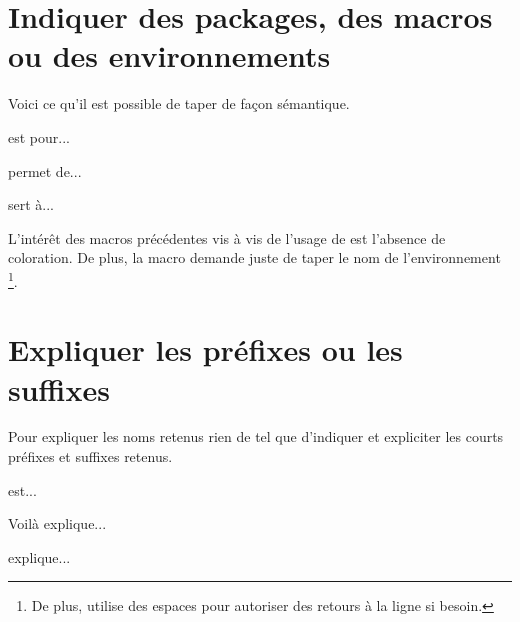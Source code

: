 

\usepackage[lang = FR]{../main/main}
\usepackage{../listing/listing}
\usepackage{../rem-exa/rem-exa}


\usepackage{macroenv}




\section{Indiquer des packages, des macros ou des environnements}

Voici ce qu'il est possible de taper de façon sémantique.

\begin{bdoclatex}
 est pour...

 permet de...

 sert à...
\end{bdoclatex}


\begin{bdocrem}
    L'intérêt des macros précédentes vis à vis de l'usage de  est l'absence de coloration.
    De plus, la macro  demande juste de taper le nom de l'environnement
    \footnote{
        De plus,  utilise des espaces pour autoriser des retours à la ligne si besoin.
    }.
\end{bdocrem}




\section{Expliquer les préfixes ou les suffixes}

Pour expliquer les noms retenus rien de tel que d'indiquer et expliciter les courts préfixes et suffixes retenus.

\begin{bdoclatex}
 est...

Voilà  explique...

 explique...
\end{bdoclatex}



